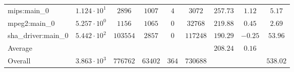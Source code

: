 \begin{tabular}{|l|c|c|c|c|c|c|c|c|}
mips:main\_0            & $ 1.124 \cdot 10^{1}  $ & $ 2896   $ & $ 1007  $ & $ 4   $ & $ 3072   $ & $ 257.73      $ & $ 1.12    $ & $ 5.17    $ \\
mpeg2:main\_0           & $ 5.257 \cdot 10^{0}  $ & $ 1156   $ & $ 1065  $ & $ 0   $ & $ 32768  $ & $ 219.88      $ & $ 0.45    $ & $ 2.69    $ \\
sha\_driver:main\_0     & $ 5.442 \cdot 10^{2}  $ & $ 103554 $ & $ 2857  $ & $ 0   $ & $ 117248 $ & $ 190.29      $ & $ -0.25   $ & $ 53.96   $ \\
\hline
Average                 & $                     $ & $        $ & $       $ & $     $ & $        $ & $ 208.24      $ & $ 0.16    $ & $         $ \\
\hline
Overall                 & $ 3.863 \cdot 10^{3}  $ & $ 776762 $ & $ 63402 $ & $ 364 $ & $ 730688 $ & $             $ & $         $ & $ 538.02  $ \\
\hline
\end{tabular}
